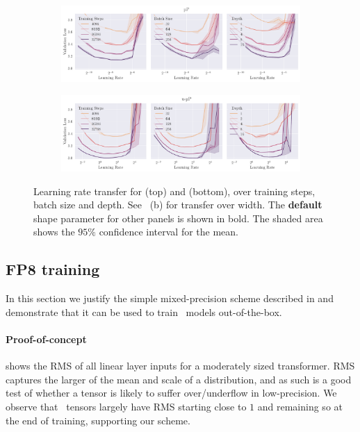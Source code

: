 \begin{figure}[t]
    \centering
    \begin{subfigure}{\textwidth}
        \centering
        \includegraphics[width=\textwidth]{arXiv/figures/lr_transfer_mup.pdf}
    \end{subfigure}
    \begin{subfigure}{\textwidth}
        \centering
        \includegraphics[width=\textwidth]{arXiv/figures/lr_transfer_u-mup.pdf}
    \end{subfigure}
    \caption{Learning rate transfer for \mup{} (top) and \umup{} (bottom), over training steps, batch size and depth. See ~(b) for transfer over width. The \textbf{default} shape parameter for other panels is shown in bold. The shaded area shows the $95\%$ confidence interval for the mean.}
    \label{fig:lr_transfer}
\end{figure}

\subsection{FP8 training} \label{sec:fp8_training}

In this section we justify the simple mixed-precision scheme described in  and demonstrate that it can be used to train \umup\ models out-of-the-box.

\paragraph{Proof-of-concept}  shows the RMS of all linear layer inputs for a moderately sized transformer. RMS captures the larger of the mean and scale of a distribution, and as such is a good test of whether a tensor is likely to suffer over/underflow in low-precision. We observe that \umup\ tensors largely have RMS starting close to $1$ and remaining so at the end of training, supporting our scheme.

